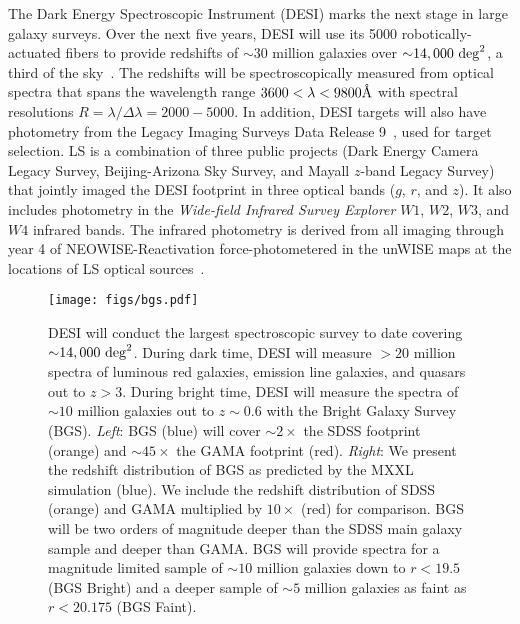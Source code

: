 The Dark Energy Spectroscopic Instrument (DESI) marks the next stage in large
galaxy surveys. 
Over the next five years, DESI will use its 5000 robotically-actuated fibers to
provide redshifts of ${\sim}30$ million galaxies over 
${\sim}14,000~{\rm deg}^2$, a third of the sky~\citep{desicollaboration2016,
desicollaboration2016a}.
The redshifts will be spectroscopically measured from optical spectra that
spans the wavelength range $3600 < \lambda < 9800\AA$ with spectral resolutions
$R = \lambda/\Delta \lambda = 2000 - 5000$.
In addition, DESI targets will also have photometry from the Legacy Imaging
Surveys Data Release 9~\citep[LS][]{dey2019}, used for target selection. 
LS is a combination of three public projects (Dark Energy Camera Legacy Survey,
Beijing-Arizona Sky Survey, and Mayall $z$-band Legacy Survey) that jointly
imaged the DESI footprint in three optical bands ($g$, $r$, and $z$). 
It also includes photometry in the \emph{Wide-field Infrared Survey Explorer}
$W1$, $W2$, $W3$, and $W4$ infrared bands.
The infrared photometry is derived from all imaging through year 4 of
NEOWISE-Reactivation force-photometered in the unWISE maps at the locations of
LS optical sources~\citep{meisner2017, meisner2017a}.

\begin{figure}
\begin{center}
\texttt{[image: figs/bgs.pdf]} 
\caption{
    DESI will conduct the largest spectroscopic survey to date covering
    ${\sim}14,000~{\rm deg}^2$. 
    During dark time, DESI will measure ${>}20$ million spectra of luminous red
    galaxies, emission line galaxies, and quasars out to $z > 3$.
    During bright time, DESI will measure the spectra of ${\sim}10$ million
    galaxies out to $z{\sim}0.6$ with the Bright Galaxy Survey (BGS).
    {\em Left}: BGS (blue) will cover ${\sim}2\times$ the SDSS footprint
    (orange) and ${\sim}45\times$ the GAMA footprint (red).
    {\em Right}: We present the redshift distribution of BGS as predicted by
    the MXXL simulation (blue). 
    We include the redshift distribution of SDSS (orange) and GAMA multiplied
    by $10\times$ (red) for comparison. 
    BGS will be two orders of magnitude deeper than the SDSS main galaxy sample
    and deeper than GAMA.
    BGS will provide spectra for a magnitude limited sample of ${\sim}10$
    million galaxies down to $r < 19.5$ (BGS Bright) and a deeper sample of
    ${\sim 5}$ million galaxies as faint as $r < 20.175$ (BGS Faint).
}
\label{fig:bgs}
\end{center}
\end{figure}

